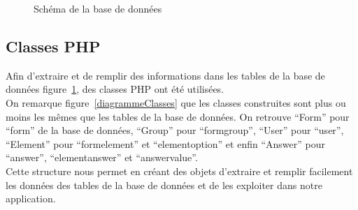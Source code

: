 \documentclass{sigplanconf}
\begin{document}
\begin{figure}
\begin{center}
\end{center}
\caption{Schéma de la base de données}\label{schemaBDD}
\end{figure}

\subsection{Classes PHP}
Afin d'extraire et de remplir des informations dans les tables de la base de données figure~\ref{schemaBDD}, des classes PHP ont été utilisées.\\
On remarque figure~\ref{diagrammeClasses} que les classes construites sont plus ou moins les mêmes que les tables de la base de données. On retrouve ``Form'' pour ``form'' de la base de données, ``Group'' pour ``formgroup'', ``User'' pour ``user'', ``Element'' pour ``formelement'' et ``elementoption'' et enfin ``Answer'' pour ``answer'', ``elementanswer'' et ``answervalue''.\\
Cette structure nous permet en créant des objets d'extraire et remplir facilement les données des tables de la base de données et de les exploiter dans notre application.
\end{document}
